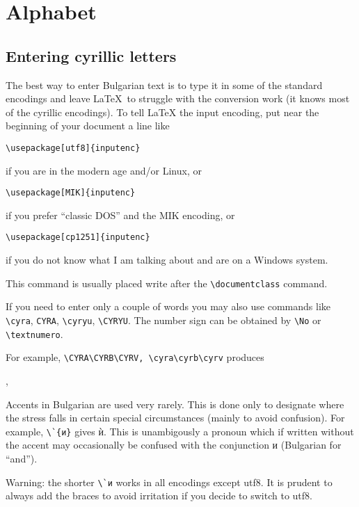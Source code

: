 \documentclass[12pt,a4paper,twosided]{article}
\begin{document}
\section{Alphabet} \label{sec:alphabet}



\subsection{Entering cyrillic letters}

The best way to enter Bulgarian text is to type it in some of the standard encodings
and leave \LaTeX\ to struggle with the conversion work (it knows most of the cyrillic
encodings).  To tell \LaTeX{} the input encoding, put near the beginning of your document a
line like
\begin{center}
\verb+\usepackage[utf8]{inputenc}+
\end{center}
if you are in the modern age and/or Linux,
or
\begin{center}
\verb+\usepackage[MIK]{inputenc}+
\end{center}
if you prefer ``classic DOS'' and the MIK encoding,
or
\begin{center}
\verb+\usepackage[cp1251]{inputenc}+
\end{center}
if you do not know what I am talking about and are on a Windows system.

This command is usually placed write after the \verb+\documentclass+ command.

If you need to enter only a couple of words you may also use commands like \verb+\cyra+,
\verb+CYRA+, \verb+\cyryu+, \verb+\CYRYU+. The number sign can be obtained by \verb+\No+ or
\verb+\textnumero+.

For example, \verb+\CYRA\CYRB\CYRV, \cyra\cyrb\cyrv+ produces
\begin{center}
\CYRA\CYRB\CYRV, \cyra\cyrb\cyrv
\end{center}

Accents in Bulgarian are used very rarely. This is done only to designate where the stress
falls in certain special circumstances (mainly to avoid confusion). For example, \verb+\`{и}+
gives \`{и}. This is unambigously a pronoun which if written without the accent may
occasionally be confused with the conjunction и (Bulgarian for ``and''). 

Warning: the shorter \verb+\`и+ works in all encodings except utf8. It is prudent to always
add the braces to avoid irritation if you decide to switch to utf8. 
\end{document}
